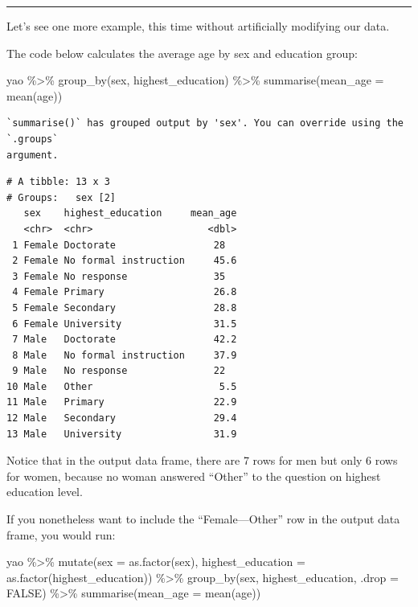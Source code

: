 \documentclass[
  letterpaper,
  DIV=11,
  numbers=noendperiod]{scrreprt}
\newenvironment{Shaded}{\begin{snugshade}}{\end{snugshade}}
\newcommand{\AttributeTok}[1]{\textcolor[rgb]{0.40,0.45,0.13}{#1}}
\newcommand{\ConstantTok}[1]{\textcolor[rgb]{0.56,0.35,0.01}{#1}}
\newcommand{\FunctionTok}[1]{\textcolor[rgb]{0.28,0.35,0.67}{#1}}
\newcommand{\NormalTok}[1]{\textcolor[rgb]{0.00,0.23,0.31}{#1}}
\newcommand{\SpecialCharTok}[1]{\textcolor[rgb]{0.37,0.37,0.37}{#1}}
\begin{document}
\begin{center}\rule{0.5\linewidth}{0.5pt}\end{center}

Let's see one more example, this time without artificially modifying our
data.

The code below calculates the average age by sex and education group:

\begin{Shaded}
\begin{Highlighting}[]
\NormalTok{yao }\SpecialCharTok{\%\textgreater{}\%} 
  \FunctionTok{group\_by}\NormalTok{(sex, highest\_education) }\SpecialCharTok{\%\textgreater{}\%} 
  \FunctionTok{summarise}\NormalTok{(}\AttributeTok{mean\_age =} \FunctionTok{mean}\NormalTok{(age))}
\end{Highlighting}
\end{Shaded}

\begin{verbatim}
`summarise()` has grouped output by 'sex'. You can override using the `.groups`
argument.
\end{verbatim}

\begin{verbatim}
# A tibble: 13 x 3
# Groups:   sex [2]
   sex    highest_education     mean_age
   <chr>  <chr>                    <dbl>
 1 Female Doctorate                 28  
 2 Female No formal instruction     45.6
 3 Female No response               35  
 4 Female Primary                   26.8
 5 Female Secondary                 28.8
 6 Female University                31.5
 7 Male   Doctorate                 42.2
 8 Male   No formal instruction     37.9
 9 Male   No response               22  
10 Male   Other                      5.5
11 Male   Primary                   22.9
12 Male   Secondary                 29.4
13 Male   University                31.9
\end{verbatim}

Notice that in the output data frame, there are 7 rows for men but only
6 rows for women, because no woman answered ``Other'' to the question on
highest education level.

If you nonetheless want to include the ``Female---Other'' row in the
output data frame, you would run:

\begin{Shaded}
\begin{Highlighting}[]
\NormalTok{yao }\SpecialCharTok{\%\textgreater{}\%} 
  \FunctionTok{mutate}\NormalTok{(}\AttributeTok{sex =} \FunctionTok{as.factor}\NormalTok{(sex), }
         \AttributeTok{highest\_education =} \FunctionTok{as.factor}\NormalTok{(highest\_education)) }\SpecialCharTok{\%\textgreater{}\%} 
  \FunctionTok{group\_by}\NormalTok{(sex, highest\_education, }\AttributeTok{.drop =} \ConstantTok{FALSE}\NormalTok{) }\SpecialCharTok{\%\textgreater{}\%} 
  \FunctionTok{summarise}\NormalTok{(}\AttributeTok{mean\_age =} \FunctionTok{mean}\NormalTok{(age))}
\end{Highlighting}
\end{Shaded}
\end{document}
